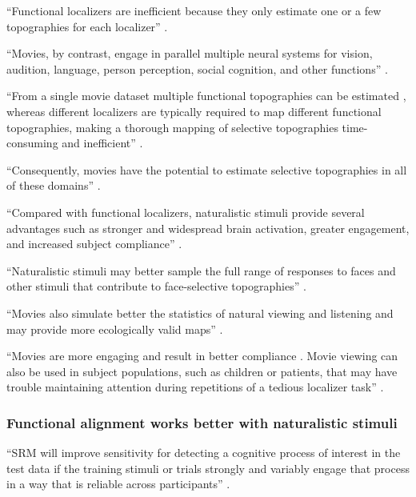 %
``Functional localizers are inefficient because they only estimate one or a few
topographies for each localizer'' \citep{jiahui2020predicting}.

%
``Movies, by contrast, engage in parallel multiple neural systems for vision,
audition, language, person perception, social cognition, and other functions''
\citep{jiahui2020predicting}.

%
``From a single movie dataset multiple functional topographies can be estimated
\citep{guntupalli2016model}, whereas different localizers are typically required
to map different functional topographies, making a thorough mapping of selective
topographies time-consuming and inefficient'' \citep{jiahui2020predicting}.

%
``Consequently, movies have the potential to estimate selective topographies in
all of these domains'' \citep{jiahui2020predicting}.


``Compared with functional localizers, naturalistic stimuli provide several
advantages such as stronger and widespread brain activation, greater engagement,
and increased subject compliance'' \citep{jiahui2020predicting}.

%
``Naturalistic stimuli may better sample the full range of responses to faces
and other stimuli that contribute to face-selective topographies''
\citep{jiahui2020predicting}.

%
``Movies also simulate better the statistics of natural viewing and listening
and may provide more ecologically valid maps'' \citep{jiahui2020predicting}.

%
``Movies are more engaging and result in better compliance
\citep{vanderwal2015inscapes}.
%
Movie viewing can also be used in subject populations, such as children
\citep{richardson2018development} or patients, that may have trouble maintaining
attention during repetitions of a tedious localizer task''
\citep{jiahui2020predicting}.



\subsubsection{Functional alignment works better with naturalistic stimuli}

``SRM will improve sensitivity for detecting a cognitive process of interest in
the test data if the training stimuli or trials strongly and variably engage
that process in a way that is reliable across participants''
\citep{cohen2017computational}.

